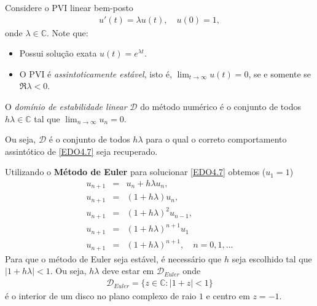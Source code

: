 Considere o PVI linear bem-posto
\begin{eqnarray}\label{EDO4.7}
  u'(t)= \lambda u(t), \quad  u(0)=1,
\end{eqnarray}
onde $\lambda  \in  \mathbb{C}$. Note que:
\begin{itemize}
\item Possui solução exata $u(t)=e^{\lambda t}.$
\item O PVI é \emph{assintoticamente estável}, isto é, $\lim_{t\rightarrow \infty }u(t)=0$, se e somente se $\Re{\lambda }<0$.
\
\end{itemize}




\begin{defn}
O \emph{domínio de estabilidade linear} $\mathcal D$ do método numérico é o conjunto de todos $h\lambda  \in  \mathbb{C}$ tal que $\lim_{n\rightarrow \infty }u_n=0$.
\end{defn}

Ou seja, $\mathcal D$ é o conjunto de todos $h\lambda $ para o qual o correto comportamento assintótico de \eqref{EDO4.7} seja recuperado.



\begin{ex}
Utilizando o \textbf{Método de Euler} para solucionar \eqref{EDO4.7} obtemos ($u_1=1$)
\begin{eqnarray}
 u_{n+1}   & =& u_n+h\lambda u_n, \\
 u_{n+1}   & =& (1+h\lambda )u_n, \\
 u_{n+1}   & =& (1+h\lambda )^2u_{n-1}, \\
 u_{n+1}   & =& (1+h\lambda )^{n+1}u_1 \\
 u_{n+1}   & =& (1+h\lambda )^{n+1}  , \quad  n=0,1,\ldots
\end{eqnarray}
Para que o método de Euler seja estável, é necessário que $h$ seja escolhido tal que $|1+h\lambda |<1$. Ou seja, $h\lambda $ deve estar em $\mathcal D_{Euler}$ onde
\begin{eqnarray}
 \mathcal D_{Euler} = \{z \in  \mathbb{C}: |1+z|<1\}
\end{eqnarray}
é o interior de um disco no plano complexo de raio $1$ e centro em $z=-1$.%
\end{ex}


